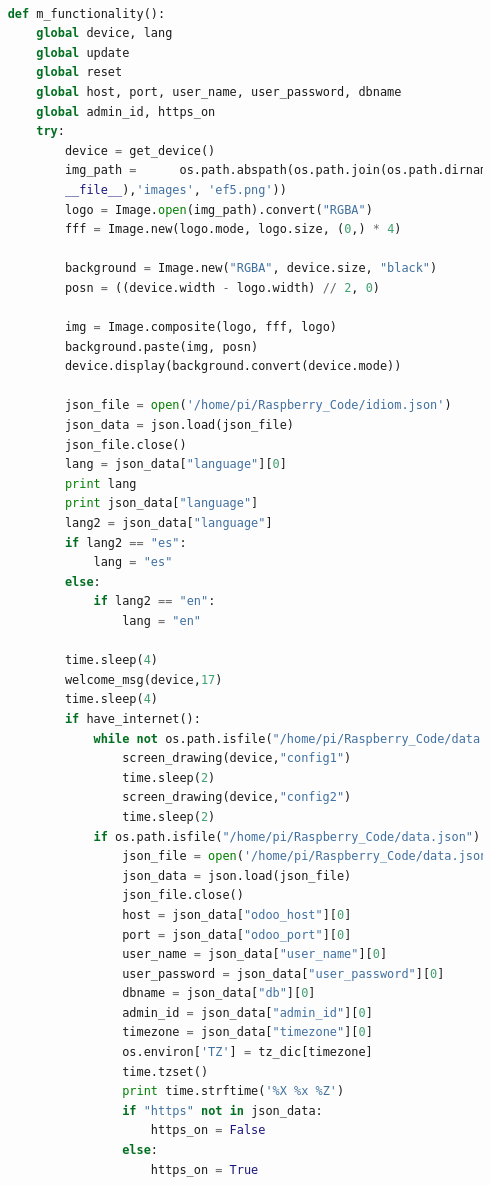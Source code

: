 \documentclass[12pt,a4paper,oneside]{article} %
\begin{document}
\begin{lstlisting}[language=python]

	def m_functionality():
	    global device, lang
	    global update
	    global reset
	    global host, port, user_name, user_password, dbname
	    global admin_id, https_on
	    try:
	        device = get_device()
	        img_path = 		os.path.abspath(os.path.join(os.path.dirname(
	        __file__),'images', 'ef5.png'))
	        logo = Image.open(img_path).convert("RGBA")
	        fff = Image.new(logo.mode, logo.size, (0,) * 4)
	
	        background = Image.new("RGBA", device.size, "black")
	        posn = ((device.width - logo.width) // 2, 0)
	
	        img = Image.composite(logo, fff, logo)
	        background.paste(img, posn)
	        device.display(background.convert(device.mode))
	
	        json_file = open('/home/pi/Raspberry_Code/idiom.json')
	        json_data = json.load(json_file)
	        json_file.close()
	        lang = json_data["language"][0]
	        print lang
	        print json_data["language"]
	        lang2 = json_data["language"]
	        if lang2 == "es":
	            lang = "es"
	        else:
	            if lang2 == "en":
	                lang = "en"
	
	        time.sleep(4)
	        welcome_msg(device,17)
	        time.sleep(4)
	        if have_internet():
	            while not os.path.isfile("/home/pi/Raspberry_Code/data.json"):
	                screen_drawing(device,"config1")
	                time.sleep(2)
	                screen_drawing(device,"config2")
	                time.sleep(2)
	            if os.path.isfile("/home/pi/Raspberry_Code/data.json"):
	                json_file = open('/home/pi/Raspberry_Code/data.json')
	                json_data = json.load(json_file)
	                json_file.close()
	                host = json_data["odoo_host"][0]
	                port = json_data["odoo_port"][0]
	                user_name = json_data["user_name"][0]
	                user_password = json_data["user_password"][0]
	                dbname = json_data["db"][0]
	                admin_id = json_data["admin_id"][0]
	                timezone = json_data["timezone"][0]
	                os.environ['TZ'] = tz_dic[timezone]
	                time.tzset()
	                print time.strftime('%X %x %Z')
	                if "https" not in json_data:
	                    https_on = False
	                else:
	                    https_on = True
	

\end{lstlisting}
\end{document}

